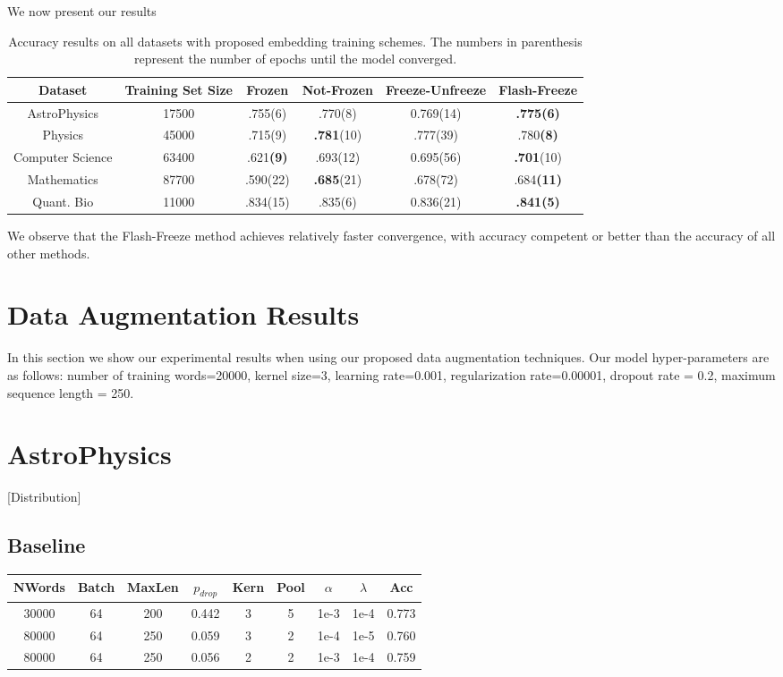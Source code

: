 We now present our results
\begin{center}\begin{table}[H]\begin{tabular}{||c c c c c c ||}
 \hline
 Dataset & Training Set Size & Frozen & Not-Frozen & Freeze-Unfreeze & Flash-Freeze\\ [0.5ex]
 \hline\hline
AstroPhysics & 17500 & .755(6) & .770(8) & 0.769(14) & \textbf{.775(6)}\\
Physics &  45000 & .715(9) & \textbf{.781}(10) & .777(39) & .780\textbf{(8)}\\
Computer Science & 63400 & .621\textbf{(9)} & .693(12) & 0.695(56) & \textbf{.701}(10)\\
Mathematics & 87700 & .590(22) & \textbf{.685}(21) & .678(72) & .684\textbf{(11)}\\
Quant. Bio & 11000 & .834(15) & .835(6) & 0.836(21) & \textbf{.841(5)}\\
 [1ex]\hline\end{tabular}\caption{Accuracy results on all datasets with proposed embedding training schemes.
 The numbers in parenthesis represent the number of epochs until the model converged.}
\end{table}\end{center}

We observe that the Flash-Freeze method achieves relatively faster convergence, with accuracy competent or better than
the accuracy of all other methods.

\section{Data Augmentation Results}
In this section we show our experimental results when using our proposed data augmentation techniques. Our model hyper-parameters are as follows:
number of training words=20000, kernel size=3, learning rate=0.001, regularization rate=0.00001,
dropout rate = 0.2, maximum sequence length = 250.

%
%
\section{AstroPhysics}
[Distribution]
\subsection{Baseline}
\begin{center}\begin{tabular}{||c c c c c c c c c||}
 \hline
 NWords & Batch & MaxLen & $p_{drop}$ & Kern & Pool & $\alpha$ & $\lambda$ & Acc\\ [0.5ex]
 \hline\hline
 30000 & 64 & 200 & 0.442 & 3 & 5 & 1e-3 & 1e-4 & 0.773\\
 \hline
 80000 & 64 & 250 & 0.059 & 3 & 2 & 1e-4 & 1e-5 & 0.760\\
 \hline
 80000 & 64 & 250 & 0.056 & 2 & 2 & 1e-3 & 1e-4 & 0.759\\
 [1ex]\hline\end{tabular}\end{center}

